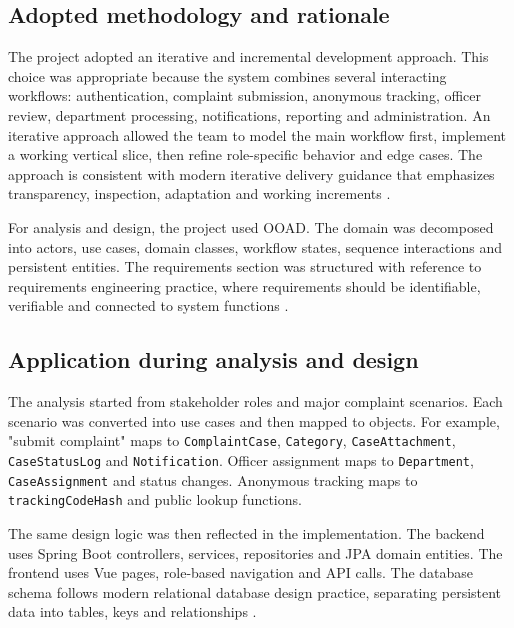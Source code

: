 \documentclass[11pt,a4paper]{article}
\begin{document}
\subsection{Adopted methodology and rationale}
The project adopted an iterative and incremental development approach. This choice was appropriate because the system combines several interacting workflows: authentication, complaint submission, anonymous tracking, officer review, department processing, notifications, reporting and administration. An iterative approach allowed the team to model the main workflow first, implement a working vertical slice, then refine role-specific behavior and edge cases. The approach is consistent with modern iterative delivery guidance that emphasizes transparency, inspection, adaptation and working increments \cite{ScrumGuide2020}.

For analysis and design, the project used OOAD. The domain was decomposed into actors, use cases, domain classes, workflow states, sequence interactions and persistent entities. The requirements section was structured with reference to requirements engineering practice, where requirements should be identifiable, verifiable and connected to system functions \cite{ISO29148}.

\subsection{Application during analysis and design}
The analysis started from stakeholder roles and major complaint scenarios. Each scenario was converted into use cases and then mapped to objects. For example, "submit complaint" maps to \texttt{ComplaintCase}, \texttt{Category}, \texttt{CaseAttachment}, \texttt{CaseStatusLog} and \texttt{Notification}. Officer assignment maps to \texttt{Department}, \texttt{CaseAssignment} and status changes. Anonymous tracking maps to \texttt{trackingCodeHash} and public lookup functions.

The same design logic was then reflected in the implementation. The backend uses Spring Boot controllers, services, repositories and JPA domain entities. The frontend uses Vue pages, role-based navigation and API calls. The database schema follows modern relational database design practice, separating persistent data into tables, keys and relationships \cite{DatabaseConcepts2019}.
\end{document}
